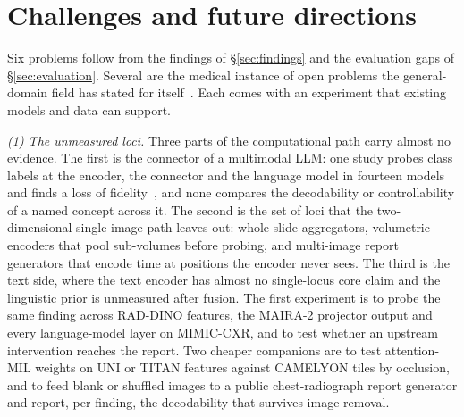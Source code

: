 \section{Challenges and future directions}
\label{sec:future}

Six problems follow from the findings of \S\ref{sec:findings} and the evaluation gaps of
\S\ref{sec:evaluation}. Several are the medical instance of open problems the general-domain field has
stated for itself~\cite{sharkey2025open}. Each comes with an experiment that existing models and data
can support.

\textit{(1) The unmeasured loci.} Three parts of the computational path carry almost no evidence. The
first is the connector of a multimodal LLM: one study probes class labels at the encoder, the connector
and the language model in fourteen models and finds a loss of fidelity~\cite{zhu2026lost}, and none
compares the decodability or controllability of a named concept across it. The second is the set of
loci that the two-dimensional single-image path leaves out: whole-slide aggregators, volumetric
encoders that pool sub-volumes before probing, and multi-image report generators that encode time at
positions the encoder never sees. The third is the text side, where the text encoder has almost no
single-locus core claim and the linguistic prior is unmeasured after fusion. The first experiment is to
probe the same finding across RAD-DINO features, the MAIRA-2 projector output and every language-model
layer on MIMIC-CXR, and to test whether an upstream intervention reaches the report. Two cheaper
companions are to test attention-MIL weights on UNI or TITAN features against CAMELYON tiles by
occlusion, and to feed blank or shuffled images to a public chest-radiograph report generator and
report, per finding, the decodability that survives image removal.

